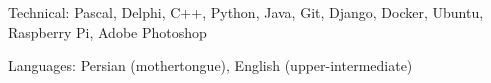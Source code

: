 

\begin{cvskills}

  \cvskill
    {Technical:}
    {Pascal, Delphi, C++, Python, Java, Git, Django, Docker, Ubuntu, Raspberry Pi, Adobe Photoshop}




  \cvskill
    {Languages:}
    {Persian (mothertongue), English (upper-intermediate)} %

\end{cvskills}
